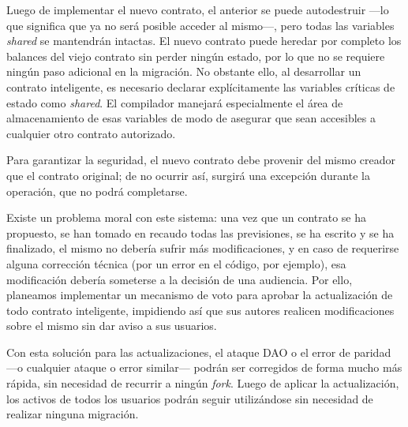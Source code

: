 Luego de implementar el nuevo contrato, el anterior se puede autodestruir —lo que significa que ya no será posible acceder al mismo—, pero todas las variables \textit{shared} se mantendrán intactas. El nuevo contrato puede heredar por completo los balances del viejo contrato sin perder ningún estado, por lo que no se requiere ningún paso adicional en la migración. No obstante ello, al desarrollar un contrato inteligente, es necesario declarar explícitamente las variables críticas de estado como \textit{shared}. El compilador manejará especialmente el área de almacenamiento de esas variables de modo de asegurar que sean accesibles a cualquier otro contrato autorizado.

Para garantizar la seguridad, el nuevo contrato debe provenir del mismo creador que el contrato original; de no ocurrir así, surgirá una excepción durante la operación, que no podrá completarse.

Existe un problema moral con este sistema: una vez que un contrato se ha propuesto, se han tomado en recaudo todas las previsiones, se ha escrito y se ha finalizado, el mismo no debería sufrir más modificaciones, y en caso de requerirse alguna corrección técnica (por un error en el código, por ejemplo), esa modificación debería someterse a la decisión de una audiencia. Por ello, planeamos implementar un mecanismo de voto para aprobar la actualización de todo contrato inteligente, impidiendo así que sus autores realicen modificaciones sobre el mismo sin dar aviso a sus usuarios.

Con esta solución para las actualizaciones, el ataque DAO o el error de paridad —o cualquier ataque o error similar— podrán ser corregidos de forma mucho más rápida, sin necesidad de recurrir a ningún \textit{fork}. Luego de aplicar la actualización, los activos de todos los usuarios podrán seguir utilizándose sin necesidad de realizar ninguna migración.